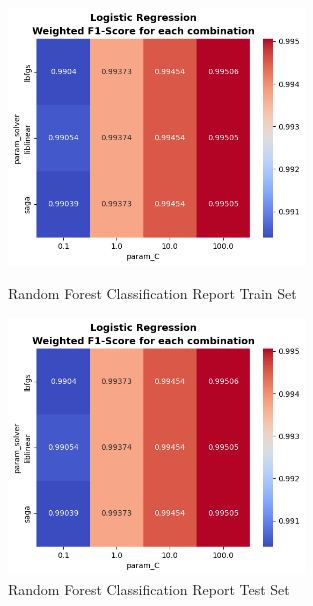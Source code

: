 \begin{figure}[H]
            \vspace{0.5cm}  %

            \begin{minipage}{\textwidth}
                \begin{minipage}[t]{0.48\textwidth}
                    \centering
                    \includegraphics[width=0.7\textwidth]{../figures/plots/section2/weighted_f1_score_for_each_combination_of_parameters_logistic_regression}
                    \caption{Random Forest Classification Report Train Set}
                    \label{fig:}
                \end{minipage}%
                \hfill%
                \begin{minipage}[t]{0.48\textwidth}
                    \centering
                    \includegraphics[width=0.7\textwidth]{../figures/plots/section2/weighted_f1_score_for_each_combination_of_parameters_logistic_regression}
                    \caption{Random Forest Classification Report Test Set}
                    \label{fig:}
                \end{minipage}  
            
            \end{minipage}
            
        \end{figure}
            
